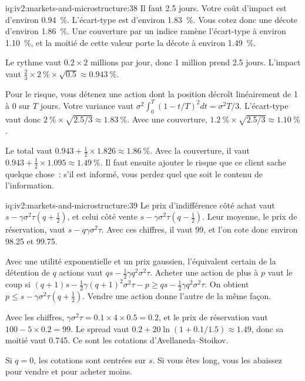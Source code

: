 \begin{solution}{iq:iv2:markets-and-microstructure:38}
Il faut 2.5 jours. Votre coût d'impact est d'environ 0.94~\%. L'écart-type est d'environ 1.83~\%. Vous cotez donc une décote d'environ 1.86~\%. Une couverture par un indice ramène l'écart-type à environ 1.10~\%, et la moitié de cette valeur porte la décote à environ 1.49~\%.

Le rythme vaut $0.2 \times 2$ millions par jour, donc 1 million prend 2.5 jours. L'impact vaut $\tfrac23 \times 2~\% \times \sqrt{0.5} \approx 0.943~\%$.

Pour le risque, vous détenez une action dont la position décroît linéairement de 1 à 0 sur $T$ jours. Votre variance vaut $\sigma^2\int_0^T (1 - t/T)^2 dt = \sigma^2T/3$. L'écart-type vaut donc $2~\% \times \sqrt{2.5/3} \approx 1.83~\%$. Avec une couverture, $1.2~\% \times \sqrt{2.5/3} \approx 1.10~\%$.

Le total vaut $0.943 + \tfrac12 \times 1.826 \approx 1.86~\%$. Avec la couverture, il vaut $0.943 + \tfrac12 \times 1.095 \approx 1.49~\%$. Il faut ensuite ajouter le risque que ce client sache quelque chose~: s'il est informé, vous perdez quel que soit le contenu de l'information.

\end{solution}

\begin{solution}{iq:iv2:markets-and-microstructure:39}
Le prix d'indifférence côté achat vaut $s - \gamma\sigma^2\tau(q + \tfrac12)$, et celui côté vente $s - \gamma\sigma^2\tau(q - \tfrac12)$. Leur moyenne, le prix de réservation, vaut $s - q\gamma\sigma^2\tau$. Avec ces chiffres, il vaut 99, et l'on cote donc environ 98.25 et 99.75.

Avec une utilité exponentielle et un prix gaussien, l'équivalent certain de la détention de $q$ actions vaut $qs - \tfrac12\gamma q^2\sigma^2\tau$. Acheter une action de plus à $p$ vaut le coup si $(q + 1)s - \tfrac12\gamma(q + 1)^2\sigma^2\tau - p \geq qs - \tfrac12\gamma q^2\sigma^2\tau$. On obtient $p \leq s - \gamma\sigma^2\tau(q + \tfrac12)$. Vendre une action donne l'autre de la même façon.

Avec les chiffres, $\gamma\sigma^2\tau = 0.1 \times 4 \times 0.5 = 0.2$, et le prix de réservation vaut $100 - 5 \times 0.2 = 99$. Le spread vaut $0.2 + 20\ln(1 + 0.1/1.5) \approx 1.49$, donc sa moitié vaut 0.745. Ce sont les cotations d'Avellaneda--Stoikov.

Si $q = 0$, les cotations sont centrées sur $s$. Si vous êtes long, vous les abaissez pour vendre et pour acheter moins.

\end{solution}

